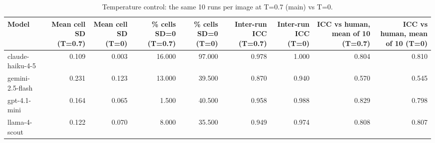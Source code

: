 \begin{table}
\caption{Temperature control: the same 10 runs per image at T=0.7 (main) vs T=0.}
\begin{tabular}{lrrrrrrrr}
\toprule
Model & Mean cell SD (T=0.7) & Mean cell SD (T=0) & \% cells SD=0 (T=0.7) & \% cells SD=0 (T=0) & Inter-run ICC (T=0.7) & Inter-run ICC (T=0) & ICC vs human, mean of 10 (T=0.7) & ICC vs human, mean of 10 (T=0) \\
\midrule
claude-haiku-4-5 & 0.109 & 0.003 & 16.000 & 97.000 & 0.978 & 1.000 & 0.804 & 0.810 \\
gemini-2.5-flash & 0.231 & 0.123 & 13.000 & 39.500 & 0.870 & 0.940 & 0.570 & 0.545 \\
gpt-4.1-mini & 0.164 & 0.065 & 1.500 & 40.500 & 0.958 & 0.988 & 0.829 & 0.798 \\
llama-4-scout & 0.122 & 0.070 & 8.000 & 35.500 & 0.949 & 0.974 & 0.808 & 0.807 \\
\bottomrule
\end{tabular}
\end{table}
